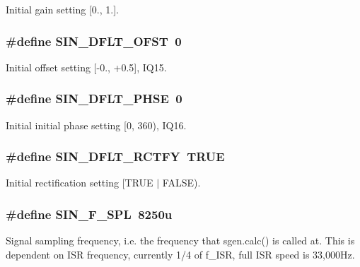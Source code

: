 Initial gain setting \mbox{[}0., 1.\mbox{]}. \hypertarget{a00045_a9c042423a04dc371b1c79ecc1f16e813}{
\subsubsection[{S\-I\-N\-\_\-\-D\-F\-L\-T\-\_\-\-O\-F\-S\-T}]{\setlength{\rightskip}{0pt plus 5cm}\#define S\-I\-N\-\_\-\-D\-F\-L\-T\-\_\-\-O\-F\-S\-T~0}}\label{a00045_a9c042423a04dc371b1c79ecc1f16e813}
Initial offset setting \mbox{[}-\/0., +0.5\mbox{]}, I\-Q15. \hypertarget{a00045_ae88ab3e38bc960b4c0e15f9712d25f72}{
\subsubsection[{S\-I\-N\-\_\-\-D\-F\-L\-T\-\_\-\-P\-H\-S\-E}]{\setlength{\rightskip}{0pt plus 5cm}\#define S\-I\-N\-\_\-\-D\-F\-L\-T\-\_\-\-P\-H\-S\-E~0}}\label{a00045_ae88ab3e38bc960b4c0e15f9712d25f72}
Initial initial phase setting \mbox{[}0, 360), I\-Q16. \hypertarget{a00045_afc105af9d8f851266d0b8e8ffe57931a}{
\subsubsection[{S\-I\-N\-\_\-\-D\-F\-L\-T\-\_\-\-R\-C\-T\-F\-Y}]{\setlength{\rightskip}{0pt plus 5cm}\#define S\-I\-N\-\_\-\-D\-F\-L\-T\-\_\-\-R\-C\-T\-F\-Y~T\-R\-U\-E}}\label{a00045_afc105af9d8f851266d0b8e8ffe57931a}
Initial rectification setting \mbox{[}T\-R\-U\-E $|$ F\-A\-L\-S\-E). \hypertarget{a00045_a8d1689d7437a3410059f1f377ec63ebd}{
\subsubsection[{S\-I\-N\-\_\-\-F\-\_\-\-S\-P\-L}]{\setlength{\rightskip}{0pt plus 5cm}\#define S\-I\-N\-\_\-\-F\-\_\-\-S\-P\-L~8250u}}\label{a00045_a8d1689d7437a3410059f1f377ec63ebd}
Signal sampling frequency, i.\-e. the frequency that sgen.\-calc() is called at. This is dependent on I\-S\-R frequency, currently 1/4 of f\-\_\-\-I\-S\-R, full I\-S\-R speed is 33,000\-Hz. 

